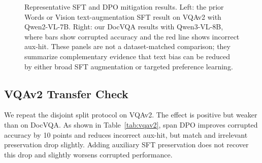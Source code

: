 \begin{figure}[t]
\begin{minipage}{0.50\textwidth}
\end{minipage}
\caption{Representative SFT and DPO mitigation results. Left: the prior Words or Vision text-augmentation SFT result on VQAv2 with Qwen2-VL-7B. Right: our DocVQA results with Qwen3-VL-8B, where bars show corrupted accuracy and the red line shows incorrect aux-hit. These panels are not a dataset-matched comparison; they summarize complementary evidence that text bias can be reduced by either broad SFT augmentation or targeted preference learning.}
\label{fig:sft-dpo-comparison}
\end{figure}

\subsection{VQAv2 Transfer Check}

We repeat the disjoint split protocol on VQAv2.
The effect is positive but weaker than on DocVQA.
As shown in Table~\ref{tab:vqav2}, span DPO improves corrupted accuracy by 10 points and reduces incorrect aux-hit, but match and irrelevant preservation drop slightly.
Adding auxiliary SFT preservation does not recover this drop and slightly worsens corrupted performance.

\begin{table}[t]
\centering
\caption{VQAv2 transfer results with Qwen3-VL-8B.}
\label{tab:vqav2}
\end{table}


